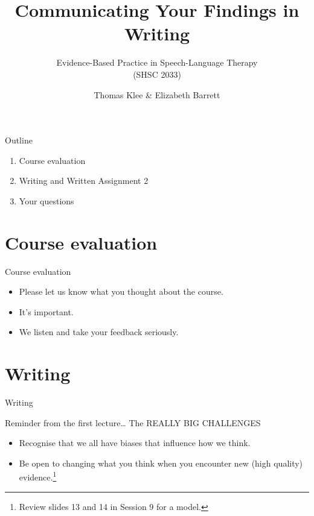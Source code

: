 \documentclass{beamer}
\title{Communicating Your Findings in Writing}
\subtitle{}
\author{Evidence-Based Practice in Speech-Language Therapy \\ (SHSC 2033)}
\institute{Session 11}
\date{Thomas Klee \& Elizabeth Barrett}
\begin{document}
\begin{frame}
	\titlepage
\end{frame}

% 
\begin{frame}{Outline}
	\begin{enumerate}
	\item Course evaluation
	\item Writing and Written Assignment 2
	\item Your questions
	\end {enumerate}
\end{frame}

\section{Course evaluation}

% 
\begin{frame}{Course evaluation}
	\begin{itemize}
	\item[\RIGHTarrow] Please let us know what you thought about the course.  
	\item[\RIGHTarrow] It's important.
	\item[\RIGHTarrow] We listen and take your feedback seriously.
	\end{itemize}
\end{frame}

\section{Writing}

\begin{frame}
	\begin{center}
	\Huge{Writing}
	\end{center}
\end{frame}

% 
\begin{frame}{Reminder from the first lecture\dots}
The REALLY BIG CHALLENGES \\
	\begin{itemize}
	\item Recognise that we all have biases that influence how we think.
	\item Be open to changing what you think when you encounter new (high quality) evidence.\footnote{Review slides 13 and 14 in Session 9 for a model.}
	\end{itemize}
\end{frame}
\end{document}
